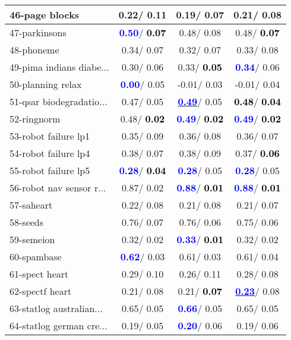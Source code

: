 \begin{table}[h]
\begin{center}
\begin{tabular}{lc|c|c}
46-page blocks &   0.22/  0.11 &   0.19/  0.07 &   0.21/  0.08 \\ \hline
47-parkinsons & \textcolor{blue}{\textbf{  0.50}}/\textcolor{black}{\textbf{  0.07}} &   0.48/  0.08 &   0.48/\textcolor{black}{\textbf{  0.07}} \\
48-phoneme &   0.34/  0.07 &   0.32/  0.07 &   0.33/  0.08 \\
49-pima indians diabe... &   0.30/  0.06 &   0.33/\textcolor{black}{\textbf{  0.05}} & \textcolor{blue}{\textbf{  0.34}}/  0.06 \\
50-planning relax & \textcolor{blue}{\textbf{  0.00}}/  0.05 &  -0.01/  0.03 &  -0.01/  0.04 \\
51-qsar biodegradatio... &   0.47/  0.05 & \underline{\textcolor{blue}{\textbf{  0.49}}}/  0.05 & \textcolor{black}{\textbf{  0.48}}/\textcolor{black}{\textbf{  0.04}} \\
52-ringnorm &   0.48/\textcolor{black}{\textbf{  0.02}} & \textcolor{blue}{\textbf{  0.49}}/\textcolor{black}{\textbf{  0.02}} & \textcolor{blue}{\textbf{  0.49}}/\textcolor{black}{\textbf{  0.02}} \\
53-robot failure lp1 &   0.35/  0.09 &   0.36/  0.08 &   0.36/  0.07 \\ \hline
54-robot failure lp4 &   0.38/  0.07 &   0.38/  0.09 &   0.37/\textcolor{black}{\textbf{  0.06}} \\
55-robot failure lp5 & \textcolor{blue}{\textbf{  0.28}}/\textcolor{black}{\textbf{  0.04}} & \textcolor{blue}{\textbf{  0.28}}/  0.05 & \textcolor{blue}{\textbf{  0.28}}/  0.05 \\
56-robot nav sensor r... &   0.87/  0.02 & \textcolor{blue}{\textbf{  0.88}}/\textcolor{black}{\textbf{  0.01}} & \textcolor{blue}{\textbf{  0.88}}/\textcolor{black}{\textbf{  0.01}} \\
57-saheart &   0.22/  0.08 &   0.21/  0.08 &   0.21/  0.07 \\
58-seeds &   0.76/  0.07 &   0.76/  0.06 &   0.75/  0.06 \\
59-semeion &   0.32/  0.02 & \textcolor{blue}{\textbf{  0.33}}/\textcolor{black}{\textbf{  0.01}} &   0.32/  0.02 \\
60-spambase & \textcolor{blue}{\textbf{  0.62}}/  0.03 &   0.61/  0.03 &   0.61/  0.04 \\ \hline
61-spect heart &   0.29/  0.10 &   0.26/  0.11 &   0.28/  0.08 \\
62-spectf heart &   0.21/  0.08 &   0.21/\textcolor{black}{\textbf{  0.07}} & \underline{\textcolor{blue}{\textbf{  0.23}}}/  0.08 \\
63-statlog australian... &   0.65/  0.05 & \textcolor{blue}{\textbf{  0.66}}/  0.05 &   0.65/  0.05 \\
64-statlog german cre... &   0.19/  0.05 & \textcolor{blue}{\textbf{  0.20}}/  0.06 &   0.19/  0.06 \\\end{tabular}\label{stratsALCKappa1bC4.5wRedux}
\end{center}
\end{table}
